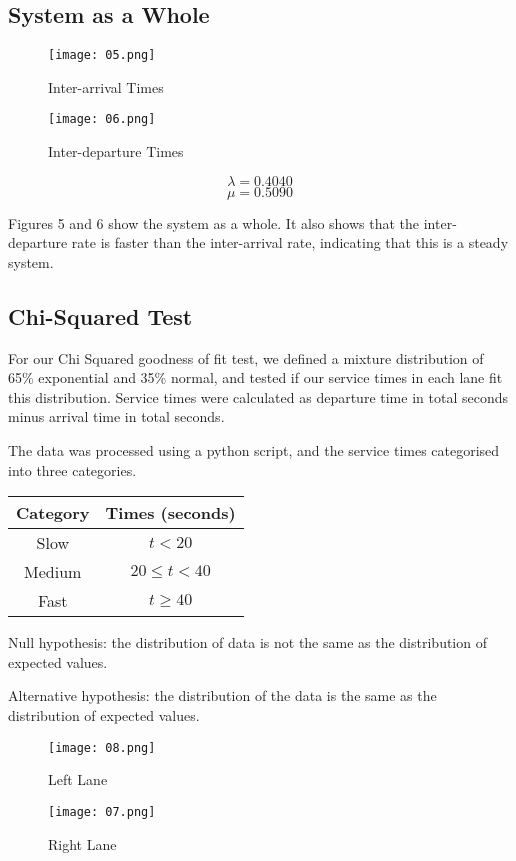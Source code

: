 \documentclass[12pt, a4paper]{article}
\begin{document}
	\subsection{System as a Whole}
	\begin{figure}[h]
		\centering
		\begin{minipage}[b]{0.48\textwidth}
			\texttt{[image: 05.png]}
			\caption{Inter-arrival Times}
		\end{minipage}
		\hfill
		\begin{minipage}[b]{0.48\textwidth}
			\texttt{[image: 06.png]}
			\caption{Inter-departure Times}
		\end{minipage}
	\end{figure}
	\[ \lambda = 0.4040 \]
	\[ \mu = 0.5090 \]
	
	Figures 5 and 6 show the system as a whole. It also shows that the inter-departure rate is faster than the inter-arrival rate, indicating that this is a steady system.  
	
	\subsection{Chi-Squared Test}
	For our Chi Squared goodness of fit test, we defined a mixture distribution of 65\% exponential and 35\% normal, and tested if our service times in each lane fit this distribution. Service times were calculated as departure time in total seconds minus arrival time in total seconds.
	
	The data was processed using a python script, and the service times categorised into three categories.
	\begin{center}\begin{tabular}{|| c | c ||}
		\hline
		Category & Times (seconds) \\
		\hline
		Slow & $t<20$ \\
		Medium & $20\leq t<40$ \\
		Fast & $t\geq40$ \\
		\hline
	\end{tabular}\end{center}
	Null hypothesis: the distribution of data is not the same as the distribution of expected values.
	
	Alternative hypothesis: the distribution of the data is the same as the distribution of expected values.
	\begin{figure}[h]
		\centering
		\begin{minipage}[b]{0.48\textwidth}
			\texttt{[image: 08.png]}
			\caption{Left Lane}
		\end{minipage}
		\hfill
		\begin{minipage}[b]{0.48\textwidth}
			\texttt{[image: 07.png]}
			\caption{Right Lane}
		\end{minipage}
	\end{figure}	
		
\end{document}
